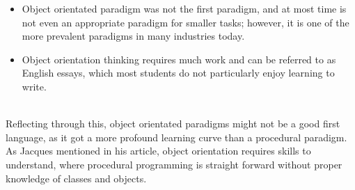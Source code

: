 \begin{itemize}
    \item Object orientated paradigm was not the first paradigm, and at most time is not even an appropriate paradigm for smaller tasks; however, it is one of the more prevalent paradigms in many industries today.   
    \item Object orientation thinking requires much work and can be referred to as English essays, which most students do not particularly enjoy learning to write.\cite{tutlisp}\cite{medlisp}
\end{itemize}\\
Reflecting through this, object orientated paradigms might not be a good first language, as it got a more profound learning curve than a procedural paradigm. As Jacques mentioned in his article, object orientation requires skills to understand, where procedural programming is straight forward without proper knowledge of classes and objects.